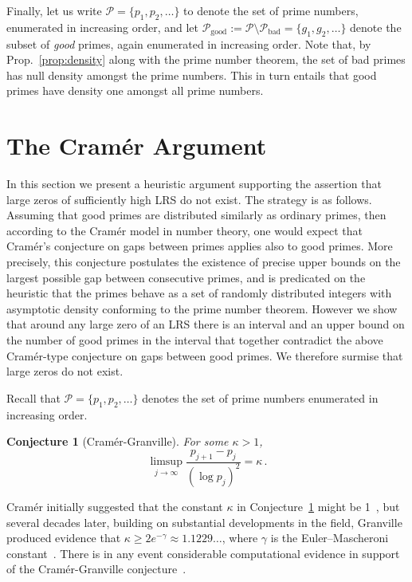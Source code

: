 \documentclass[preprint,12pt]{elsarticle}
\newtheorem{conjecture}[theorem]{Conjecture}
\begin{document}
Finally, let us write $\mathcal{P} = \{p_1, p_2, \ldots \}$ to denote
the set of prime numbers, enumerated in increasing order, and let
$\mathcal{P}_{\mathrm{good}} := \mathcal{P} \setminus
\mathcal{P}_{\mathrm{bad}} = \{g_1, g_2, \ldots\}$ denote the subset of
\emph{good} primes, again enumerated in increasing order.  Note that,
by Prop.~\ref{prop:density} along with the prime number theorem, the
set of bad primes has null density amongst the prime numbers. This in
turn entails that good primes have density one amongst all prime
numbers.


\section{The Cram\'er Argument}
\label{sec:cramer}

In this section we present a heuristic argument supporting
the
assertion that large zeros of sufficiently high LRS do not exist.  The strategy is as
follows. Assuming that good
primes are distributed similarly as ordinary primes, then according to the
Cram\'{e}r model in number theory, one would expect that Cram\'{e}r's
conjecture on gaps between primes applies also to good primes. More
precisely, this conjecture postulates the existence of precise upper
bounds on the largest possible gap between consecutive primes, and is
predicated on the heuristic that the primes behave as a set of
randomly distributed integers with asymptotic density conforming to
the prime number theorem. However we show that
around any large zero of an LRS there is an interval and an upper
bound on the number of good primes in the interval that together contradict
the above Cram\'{e}r-type conjecture on gaps between good primes.  We
therefore surmise that large zeros do not exist.

Recall that $\mathcal{P} = \{p_1, p_2, \ldots \}$ denotes the set
of prime numbers enumerated in increasing order.

\begin{conjecture}[Cram\'er-Granville]
  \label{conj:cramer}
  For some $\kappa > 1$,
  \[
    \limsup_{j \rightarrow \infty} \frac{p_{j+1} - p_j}{(\log p_j)^2} =
    \kappa \, .
\]    
\end{conjecture}

Cram\'er initially suggested that the constant $\kappa$ in
Conjecture~\ref{conj:cramer} might be 1~\cite{cramer1936}, but several
decades later, building on substantial developments in the field,
Granville produced evidence that $\kappa \geq 2e^{-\gamma} \approx
1.1229\ldots$, where $\gamma$ is the Euler–Mascheroni
constant~\cite{Granville1995}. There is in any event considerable
computational evidence in support of the Cram\'er-Granville
conjecture~\cite{Odlyzko1999,nicely99}. 
\end{document}
